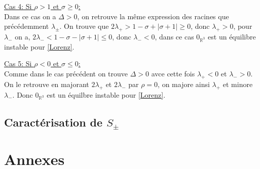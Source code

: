 \documentclass{article}
\newcommand{\R}{\mathbb{R}}
\newtheorem[M]{prop}{Proposition}[section]
\newtheorem[M]{propt}{Propriété}[section]
\newtheorem[L]{thm}{Théoreme}
\newtheorem[L]{cor}{Corollaire}
\begin{document}
\underline{Cas 4: Si $\rho > 1$ et $\sigma \ge 0 $: }\\
Dans ce cas on a $\Delta > 0$, on retrouve la même expression des racines que précédemment $\lambda_\pm$. On trouve que $2\lambda_+ > 1-\sigma+|\sigma+1| \ge 0$, donc $\lambda_+ > 0$, pour $\lambda_-$ on a, $2\lambda_- < 1-\sigma-|\sigma+1| \le 0 $, donc $\lambda_- < 0$, dans ce cas $0_{\R^3}$ est un équilibre instable pour \eqref{Lorenz}.

\underline{Cas 5: Si $\rho<0$ et $\sigma\le 0$:}\\
Comme dans le cas précédent on trouve $\Delta>0$ avce cette fois $\lambda_+ < 0$ et $\lambda_- >0$. On le retrouve en majorant $2\lambda_+$ et $2\lambda_-$ par $\rho=0$, on majore ainsi $\lambda_+$ et minore $\lambda
_-$. Donc $0_{\R^3}$ est un équilbre instable pour \eqref{Lorenz}.

\subsection{Caractérisation de $S_\pm$}
\section{Annexes}
\end{document}
